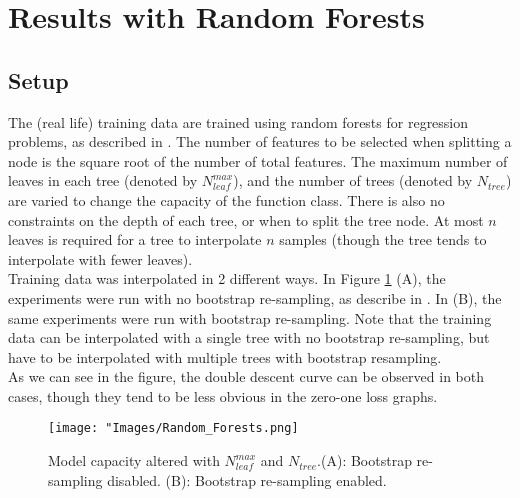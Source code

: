 \documentclass[twoside]{memoir}
\begin{document}
\section{Results with Random Forests} \label{sec:RandomForests}
\subsection{Setup}
The (real life) training data are trained using random forests for regression problems, as described in \cite{Breiman_2001}. The number of features to be selected when splitting a node is the square root of the number of total features. The maximum number of leaves in each tree (denoted by $N_{leaf}^{max}$), and the number of trees (denoted by $N_{tree}$) are varied to change the capacity of the function class. There is also no constraints on the depth of each tree, or when to split the tree node.
At most $n$ leaves is required for a tree to interpolate $n$ samples (though the tree tends to interpolate with fewer leaves).\\
Training data was interpolated in 2 different ways. In Figure \ref{fig:Random_Forests} (A), the experiments were run with no bootstrap re-sampling, as describe in \cite{Cutler_2001}. In (B), the same experiments were run with bootstrap re-sampling. Note that the training data can be interpolated with a single tree with no bootstrap re-sampling, but have to be interpolated with multiple trees with bootstrap resampling.\\
As we can see in the figure, the double descent curve can be observed in both cases, though they tend to be less obvious in the zero-one loss graphs.
\begin{figure}
	\centering
	\texttt{[image: "Images/Random\_Forests.png]}
	\par
	\caption{Model capacity altered with $N_{leaf}^{max}$ and $N_{tree}$.(A): Bootstrap re-sampling disabled. (B): Bootstrap re-sampling enabled.} \label{fig:Random_Forests}
\end{figure}
\backmatter


\end{document}
